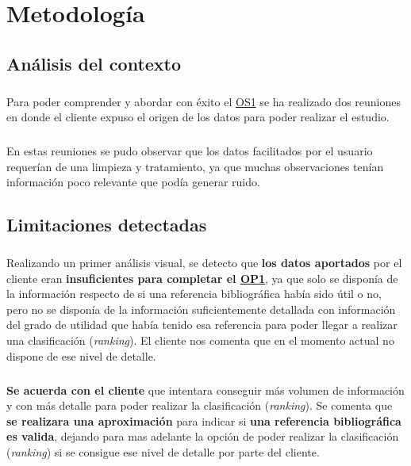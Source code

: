 \chapter{Metodología}
\label{chapter:metodologia}


\section{Análisis del contexto}

\paragraph{}
Para poder comprender y abordar con éxito el \hyperref[os:OS1]{OS1} se ha realizado dos reuniones en donde el cliente expuso el origen de los datos para poder realizar el estudio.

\paragraph{}
En estas reuniones se pudo observar que los datos facilitados por el usuario requerían de una limpieza y tratamiento, ya que muchas observaciones tenían información poco relevante que podía generar ruido\cite{ref:noisy_data}.

\section{Limitaciones detectadas}
\label{section:limit}

\paragraph{}
Realizando un primer análisis visual, se detecto que \textbf{los datos aportados} por el cliente eran \textbf{insuficientes para completar el \hyperref[op:OP1]{OP1}}, ya que solo se disponía de la información respecto de si una referencia bibliográfica había sido útil o no, pero no se disponía de la información suficientemente detallada con información del grado de utilidad que había tenido esa referencia para poder llegar a realizar una clasificación (\textit{ranking}). El cliente nos comenta que en el momento actual no dispone de ese nivel de detalle.

\paragraph{}
\textbf{Se acuerda con el cliente} que intentara conseguir más volumen de información y con más detalle para poder realizar la clasificación (\textit{ranking}). Se comenta que \textbf{se realizara una aproximación} para indicar si \textbf{una referencia bibliográfica es valida}, dejando para mas adelante la opción de poder realizar la clasificación (\textit{ranking}) si se consigue ese nivel de detalle por parte del cliente.


